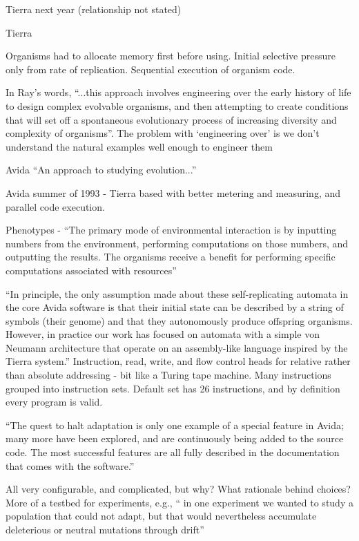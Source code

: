 Tierra next year (relationship not stated)

Tierra \parencite{Ray1991}

Organisms had to allocate memory first before using. Initial selective pressure only from rate of replication. Sequential execution of organism code. \parencite{Ofria2004}

In Ray's words, ``...this approach involves engineering over the early history of life to design complex evolvable organisms, and then attempting to create conditions that will set off a spontaneous evolutionary process of increasing diversity and complexity of organisms''\parencite{Taylor2001}. The problem with `engineering over' is we don't understand the natural examples well enough to engineer them \parencite{Taylor2001}

Avida \parencite{Ofria2004}
``An approach to studying evolution...''

Avida summer of 1993 - Tierra based with better metering and measuring, and parallel code execution.

Phenotypes - ``The primary mode of environmental interaction is by inputting numbers from the environment, performing computations on those numbers, and outputting the results. The organisms receive a
benefit for performing specific computations associated with resources''

``In principle, the only assumption made about these self-replicating automata in the core Avida software is that their initial state can be described by a string of symbols (their genome) and that they autonomously produce offspring organisms. However, in practice our work has focused on automata with a simple von Neumann architecture that operate on an assembly-like language inspired by
the Tierra system.''
Instruction, read, write, and flow control heads for relative rather than absolute addressing - bit like a Turing tape machine. Many instructions grouped into instruction sets. Default set has 26 instructions, and by definition every program is valid.

``The quest to halt adaptation is only one example of a special feature in Avida; many more have been explored, and are continuously being added to the source code. The most successful features are all fully described in the documentation that comes with the software.''

All very configurable, and complicated, but why? What rationale behind choices? More of a testbed for experiments, e.g., `` in one experiment we wanted to study a population that could not adapt, but that would nevertheless accumulate deleterious or neutral mutations through drift''

